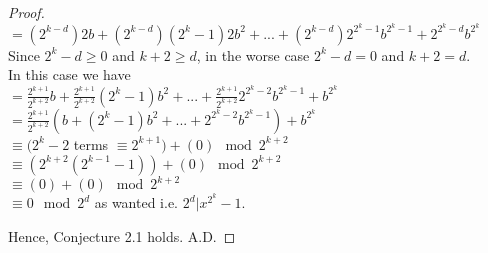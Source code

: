 \documentclass{article}
\begin{document}
\begin{flushleft}
\begin{proof}
        \hspace{.665in} $\displaystyle=(2^{k-d})2b+(2^{k-d})(2^k-1)2b^2+...+(2^{k-d})2^{2^k-1}b^{2^k-1}+2^{2^k-d}b^{2^k}$\\\vspace{.05in}
        Since $2^k-d\ge 0$ and $k+2\ge d$, in the worse case $2^k-d=0$ and $k+2=d$.\\\vspace{.05in}
        In this case we have\\\vspace{.05in}
        \hspace{.665in} $\displaystyle=\frac{2^{k+1}}{2^{k+2}}b+\frac{2^{k+1}}{2^{k+2}}(2^k-1)b^2+...+\frac{2^{k+1}}{2^{k+2}}2^{2^k-2}b^{2^k-1}+b^{2^k}$\\\vspace{.05in}
        \hspace{.665in} $\displaystyle=\frac{2^{k+1}}{2^{k+2}}\left(b+(2^k-1)b^2+...+2^{2^k-2}b^{2^k-1}\right)+b^{2^k}$\\\vspace{.05in}
        \hspace{.665in} $\equiv(2^k-2$ terms $\equiv 2^{k+1}) + (0) \mod 2^{k+2}$\\\vspace{.05in}
        \hspace{.665in} $\equiv(2^{k+2}(2^{k-1}-1))+(0)\mod 2^{k+2}$\\\vspace{.05in}
        \hspace{.665in} $\equiv(0)+(0)\mod 2^{k+2}$\\\vspace{.05in}
        \hspace{.665in} $\equiv 0\mod 2^d$ as wanted i.e. $2^d|x^{2^k}-1$. 

        \vspace{.1in}

        Hence, Conjecture 2.1 holds. \hspace{2.4in} A.D.
    \end{proof}

    \vspace{.1in}
    

\end{flushleft}
\end{document}
